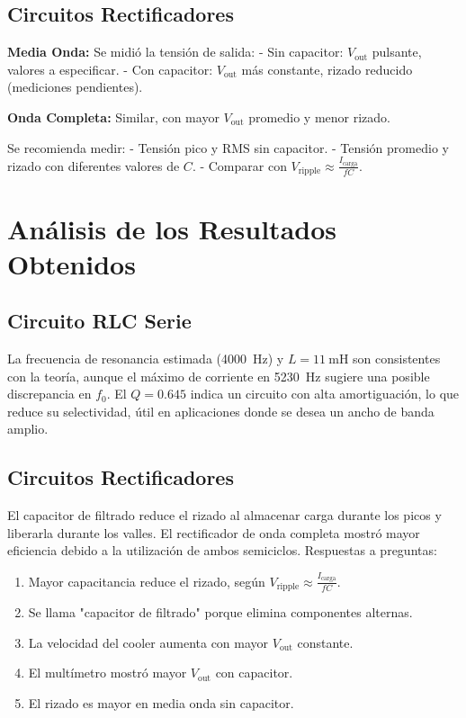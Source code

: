 \documentclass[a4paper,12pt]{article}
\begin{document}
\subsection{Circuitos Rectificadores}
\textbf{Media Onda:} Se midió la tensión de salida:
- Sin capacitor: \( V_{\text{out}} \) pulsante, valores a especificar.
- Con capacitor: \( V_{\text{out}} \) más constante, rizado reducido (mediciones pendientes).

\textbf{Onda Completa:} Similar, con mayor \( V_{\text{out}} \) promedio y menor rizado.

Se recomienda medir:
- Tensión pico y RMS sin capacitor.
- Tensión promedio y rizado con diferentes valores de \( C \).
- Comparar con \( V_{\text{ripple}} \approx \frac{I_{\text{carga}}}{f C} \).

\section{Análisis de los Resultados Obtenidos}
\subsection{Circuito RLC Serie}
La frecuencia de resonancia estimada (\SI{4000}{\hertz}) y \( L = \SI{11}{\milli\henry} \) son consistentes con la teoría, aunque el máximo de corriente en \SI{5230}{\hertz} sugiere una posible discrepancia en \( f_0 \). El \( Q = 0.645 \) indica un circuito con alta amortiguación, lo que reduce su selectividad, útil en aplicaciones donde se desea un ancho de banda amplio.

\subsection{Circuitos Rectificadores}
El capacitor de filtrado reduce el rizado al almacenar carga durante los picos y liberarla durante los valles. El rectificador de onda completa mostró mayor eficiencia debido a la utilización de ambos semiciclos. Respuestas a preguntas:
\begin{enumerate}
    \item Mayor capacitancia reduce el rizado, según \( V_{\text{ripple}} \approx \frac{I_{\text{carga}}}{f C} \).
    \item Se llama "capacitor de filtrado" porque elimina componentes alternas.
    \item La velocidad del cooler aumenta con mayor \( V_{\text{out}} \) constante.
    \item El multímetro mostró mayor \( V_{\text{out}} \) con capacitor.
    \item El rizado es mayor en media onda sin capacitor.
\end{enumerate}
\end{document}
